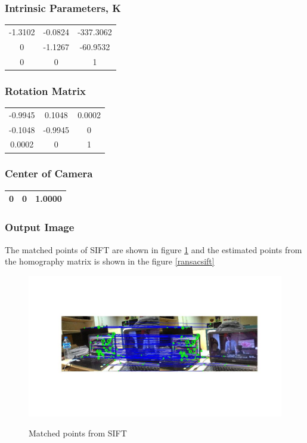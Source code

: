 \documentclass[12pt]{article}
\begin{document}
    
\subsubsection{Intrinsic Parameters, K}
\begin{tabular}{|c|c|c|}
\hline

 -1.3102 &  -0.0824 &  -337.3062 \\
 0 &  -1.1267 &  -60.9532 \\
 0 &  0 &  1 \\

\hline
\end{tabular}


\subsubsection{Rotation Matrix}
\begin{tabular}{|c|c|c|}
\hline

  -0.9945 &  0.1048 &  0.0002 \\
 -0.1048 &  -0.9945 &  0 \\
 0.0002 &  0 &  1 \\
\hline
\end{tabular}
         

\subsubsection{Center of Camera}
\begin{tabular}{|c|c|c|}
\hline

 0  &  0 &  1.0000 \\ 
  \hline
\end{tabular}



\subsubsection{Output Image}
The matched points of SIFT are shown in figure \ref{sift} and the estimated points from the homography matrix is shown in the figure \ref{ransacsift}
\begin{figure}[htp]
\centering
\includegraphics[width=1\textwidth]{siftPt.jpg}\hfill
\label{sift}
\caption{Matched points from SIFT}
\end{figure}
\end{document}

